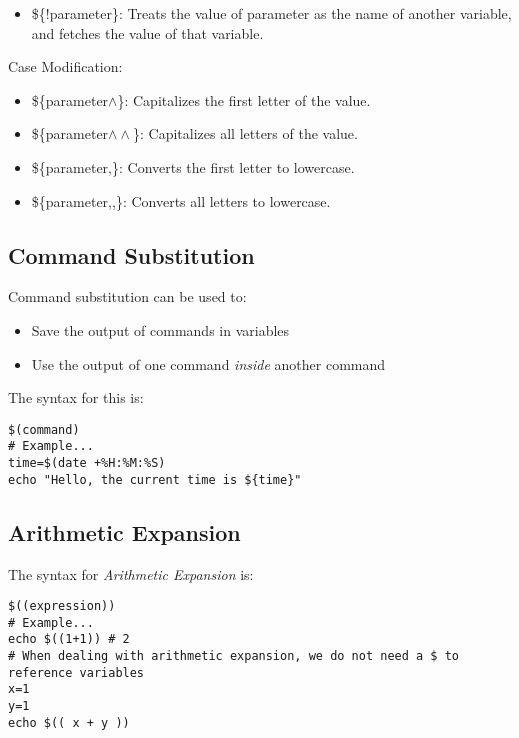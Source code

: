 \documentclass{report}
\begin{document}
    \begin{itemize}
        \item \$\{!parameter\}: Treats the value of parameter as the name of another variable, and fetches the value of that variable.
    \end{itemize}
    \bigbreak \noindent 
    Case Modification:
    \begin{itemize}
        \item \$\{parameter$\land$\}: Capitalizes the first letter of the value.
        \item \$\{parameter$\land\land$\}: Capitalizes all letters of the value.
        \item \$\{parameter,\}: Converts the first letter to lowercase.
        \item \$\{parameter,,\}: Converts all letters to lowercase.
    \end{itemize}

    \pagebreak \bigbreak \noindent 
    \subsection{Command Substitution}
    \bigbreak \noindent 
    \begin{concept}
		 Command substitution can be used to:
	\end{concept}
    \begin{itemize}
        \item Save the output of commands in variables
        \item Use the output of one command \textit{inside} another command
    \end{itemize}
    \bigbreak \noindent 
    The syntax for this is:
    
    \begin{verbatim}
$(command)
# Example...
time=$(date +%H:%M:%S)
echo "Hello, the current time is ${time}"
    \end{verbatim}
    \bigbreak \noindent
    

    \bigbreak \noindent 
    \subsection{Arithmetic Expansion}
    \bigbreak \noindent 
    The syntax for \textit{Arithmetic Expansion} is:
    
    \begin{verbatim}
$((expression))
# Example...
echo $((1+1)) # 2
# When dealing with arithmetic expansion, we do not need a $ to reference variables
x=1
y=1
echo $(( x + y ))
    \end{verbatim}
    \bigbreak \noindent
    
\end{document}

